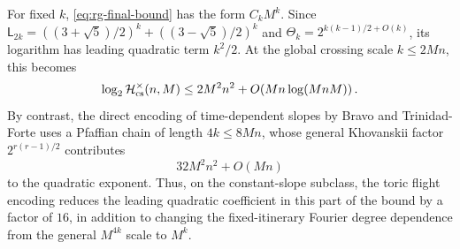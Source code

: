 \begin{remark}
For fixed $k$, \eqref{eq:rg-final-bound} has the form $C_kM^k$.  Since
$\mathsf L_{2k}=((3+\sqrt5)/2)^k+((3-\sqrt5)/2)^k$ and
$\Theta_k=2^{k(k-1)/2+O(k)}$, its logarithm has leading quadratic term
$k^2/2$.  At the global crossing scale $k\le2Mn$, this becomes
\[
 \log_2 \mathcal H_{\rm cs}^{\times}(n,M)
 \le 2M^2n^2+O\!\left(Mn\log(MnM)\right).
\]
By contrast, the direct encoding of time-dependent slopes by Bravo and
Trinidad-Forte uses a Pfaffian chain of length $4k\le8Mn$, whose general
Khovanskii factor $2^{r(r-1)/2}$ contributes
\[
 32M^2n^2+O(Mn)
\]
to the quadratic exponent.  Thus, on the constant-slope subclass, the toric
flight encoding reduces the leading quadratic coefficient in this part of the
bound by a factor of $16$, in addition to changing the fixed-itinerary Fourier
degree dependence from the general $M^{4k}$ scale to $M^k$.
\end{remark}

